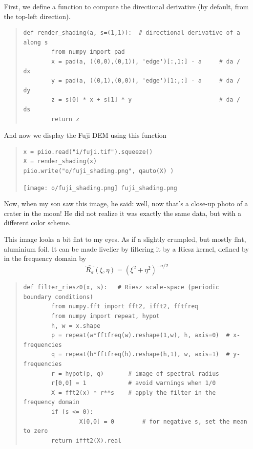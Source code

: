 First, we define a function to compute the directional derivative (by
default, from the top-left direction).

\begin{quote}
\begin{verbatim}
def render_shading(a, s=(1,1)):  # directional derivative of a along s
        from numpy import pad
        x = pad(a, ((0,0),(0,1)), 'edge')[:,1:] - a     # da / dx
        y = pad(a, ((0,1),(0,0)), 'edge')[1:,:] - a     # da / dy
        z = s[0] * x + s[1] * y                         # da / ds
        return z
\end{verbatim}
\end{quote}


And now we display the Fuji DEM using this function


\begin{quote}
\begin{verbatim}
x = piio.read("i/fuji.tif").squeeze()
X = render_shading(x)
piio.write("o/fuji_shading.png", qauto(X) )
\end{verbatim}
\texttt{[image: o/fuji\_shading.png]}~\verb+fuji_shading.png+
\end{quote}

Now, when my son saw this image, he said: well, now that's a close-up photo of a
crater in the moon!  He did not realize it was exactly the same data, but
with a different color scheme.

This image looks a bit flat to my eyes.
As if a slightly crumpled, but mostly flat, aluminium foil.
It can be made livelier by filtering it by a Riesz kernel, defined by
in the frequency domain by
\[
	\widehat{R_\sigma}(\xi,\eta)
	=
	\left(\xi^2+\eta^2\right)^{-\sigma/2}
\]

\begin{quote}
\begin{verbatim}
def filter_riesz0(x, s):   # Riesz scale-space (periodic boundary conditions)
        from numpy.fft import fft2, ifft2, fftfreq
        from numpy import repeat, hypot
        h, w = x.shape
        p = repeat(w*fftfreq(w).reshape(1,w), h, axis=0)  # x-frequencies
        q = repeat(h*fftfreq(h).reshape(h,1), w, axis=1)  # y-frequencies
        r = hypot(p, q)       # image of spectral radius
        r[0,0] = 1            # avoid warnings when 1/0
        X = fft2(x) * r**s    # apply the filter in the frequency domain
        if (s <= 0):
                X[0,0] = 0        # for negative s, set the mean to zero
        return ifft2(X).real
\end{verbatim}
\end{quote}

